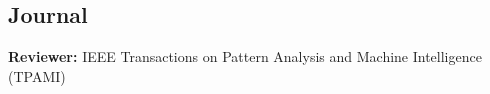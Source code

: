 \documentclass[letterpaper,11pt]{article}
\makeatletter
\newcommand{\resumeItem}[1]{
  \item\small
    {#1 \vspace{-2pt}}
  }
\newcommand{\resumeSubheading}[4]{
  \vspace{-2pt}\item
    \begin{tabular*}{0.97\textwidth}[t]{l@{\extracolsep{\fill}}r}
      \textbf{#1} & #2 \\
      \textit{\small#3} & \textit{\small #4} \\
    \end{tabular*}\vspace{-7pt}
}
\newcommand{\resumeSubHeadingListStart}{\begin{itemize}[leftmargin=0.15in, label={}]}
\newcommand{\resumeSubHeadingListEnd}{\end{itemize}}
\newcommand{\resumeItemListStart}{\begin{itemize}}
\newcommand{\resumeItemListEnd}{\end{itemize}\vspace{-5pt}}
\makeatother
\begin{document}
  \subsection*{Journal}
  \resumeSubHeadingListStart
    \small{\item{
        \textbf{Reviewer: }{IEEE Transactions on Pattern Analysis and Machine Intelligence (TPAMI)}
    }}
  \resumeSubHeadingListEnd


  
    
    
    
\end{document}
